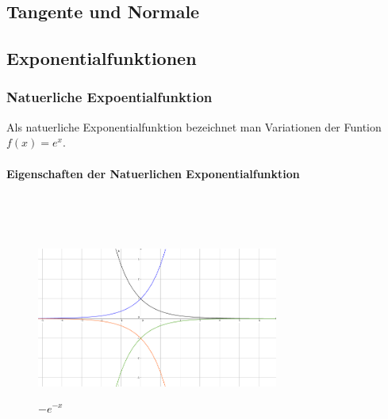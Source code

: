 \documentclass[a4paper]{article} %
\begin{document}
		\subsection{Tangente und Normale}
		\pagebreak
		\subsection{Exponentialfunktionen}
		\subsubsection{Natuerliche Expoentialfunktion}
		Als natuerliche Exponentialfunktion bezeichnet man Variationen der Funtion $f(x)=e^x$.
		\paragraph{Eigenschaften der Natuerlichen Exponentialfunktion}
		\hspace{0 cm} \\ \noindent \\
		\begin{minipage}{0.3\textwidth}
		\begin{figure}[H]
		\includegraphics[width=300px, height=200px]{E_1.png}
			\captionsetup{labelformat=empty}
				\centering
				\caption{$e^x$}
				\vspace{-0,3 cm}
				\caption{$-e^x$}
				\vspace{-0,3 cm}
				\caption{$e^{-x}$}
				\vspace{-0,3 cm}
				\caption{$-e^{-x}$}
		\end{figure}
		\end{minipage} \hfill
		\begin{minipage}{0.5\textwidth}
		\end{minipage}\\\\
\end{document}
